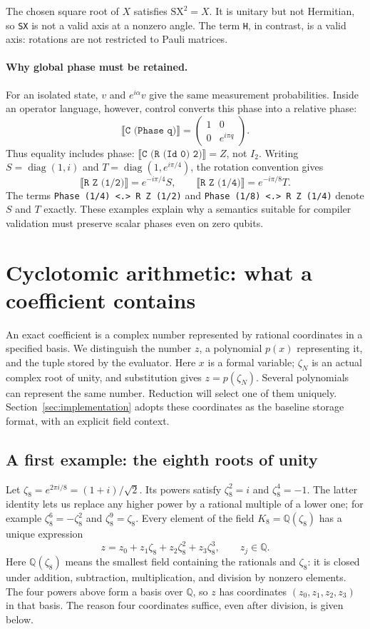 \documentclass[11pt,a4paper]{article}
\newcommand{\Q}{\mathbb{Q}}
\newcommand{\sem}[1]{\llbracket #1\rrbracket}
\newcommand{\code}[1]{\texttt{#1}}
\DeclareMathOperator{\diag}{diag}
\begin{document}
The chosen square root of $X$ satisfies $\mathrm{SX}^2=X$.
It is unitary but not Hermitian, so \code{SX} is not a valid axis
at a nonzero angle. The term \code{H}, in contrast, is a valid axis:
rotations are not restricted to Pauli matrices.

\paragraph{Why global phase must be retained.}
For an isolated state, $v$ and $e^{i\alpha}v$ give the same measurement
probabilities. Inside an operator language, however, control converts
this phase into a relative phase:
\[
\sem{\code{C (Phase q)}}=
\begin{pmatrix}1&0\\0&e^{i\pi q}\end{pmatrix}.
\]
Thus equality includes phase: $\sem{\code{C (R (Id 0) 2)}}=Z$, not $I_2$.
Writing $S=\diag(1,i)$ and $T=\diag(1,e^{i\pi/4})$, the rotation convention gives
\[
\sem{\code{R Z (1/2)}}=e^{-i\pi/4}S,\qquad
\sem{\code{R Z (1/4)}}=e^{-i\pi/8}T.
\]
The terms \code{Phase (1/4) <.> R Z (1/2)} and
\code{Phase (1/8) <.> R Z (1/4)} denote $S$ and $T$ exactly.
These examples explain why a semantics suitable for compiler validation
must preserve scalar phases even on zero qubits.
\section{Cyclotomic arithmetic: what a coefficient contains}
\label{sec:scalar}
An exact coefficient is a complex number represented by rational
coordinates in a specified basis. We distinguish the number $z$, a
polynomial $p(x)$ representing it, and the tuple stored by the evaluator.
Here $x$ is a formal variable; $\zeta_N$ is an actual complex root of unity,
and substitution gives $z=p(\zeta_N)$. Several polynomials can represent
the same number. Reduction will select one of them uniquely.
Section~\ref{sec:implementation} adopts these coordinates as the baseline
storage format, with an explicit field context.

\subsection{A first example: the eighth roots of unity}
Let $\zeta_8=e^{2\pi i/8}=(1+i)/\sqrt2$. Its powers satisfy
$\zeta_8^2=i$ and $\zeta_8^4=-1$. The latter identity lets us replace
any higher power by a rational multiple of a lower one; for example
$\zeta_8^6=-\zeta_8^2$ and $\zeta_8^9=\zeta_8$.
Every element of the field $K_8=\Q(\zeta_8)$ has a unique expression
\[
z=z_0+z_1\zeta_8+z_2\zeta_8^2+z_3\zeta_8^3,\qquad z_j\in\Q.
\]
Here $\Q(\zeta_8)$ means the smallest field containing the rationals and
$\zeta_8$: it is closed under addition, subtraction, multiplication, and
division by nonzero elements. The four powers above form a basis over
$\Q$, so $z$ has coordinates $(z_0,z_1,z_2,z_3)$ in that basis.
The reason four coordinates suffice, even after division, is given below.
\end{document}
